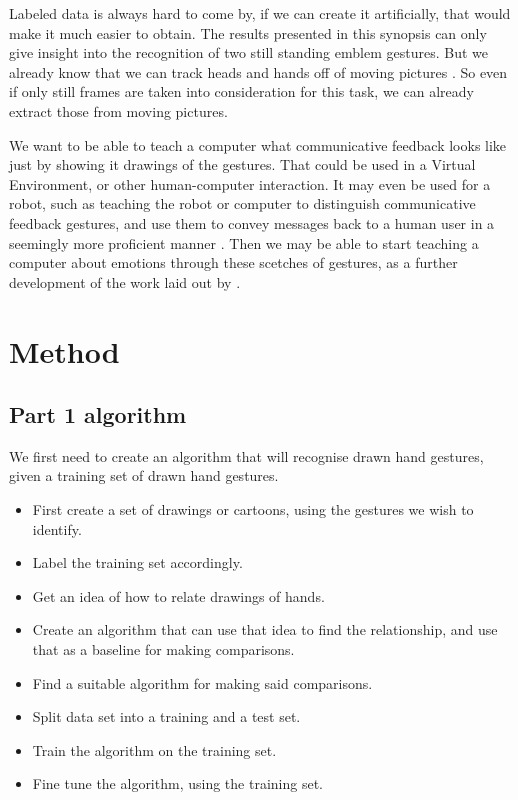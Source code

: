 \documentclass[11pt,a4paper]{article}
\begin{document}
Labeled data is always hard to come by, if we can create it artificially, that would make it much easier to obtain. The results presented in this synopsis can only give insight into the recognition of two still standing emblem gestures. But we already know that we can track heads and hands off of moving pictures \cite{rehm}. So even if only still frames are taken into consideration for this task, we can already extract those from moving pictures.

We want to be able to teach a computer what communicative feedback looks like just by showing it drawings of the gestures. That could be used in a Virtual Environment, or other human-computer interaction. It may even be used for a robot, such as teaching the robot or computer to distinguish communicative feedback gestures, and use them to convey messages back to a human user in a seemingly more proficient manner \cite{allwood}. Then we may be able to start teaching a computer about emotions through these scetches of gestures, as a further development of the work laid out by \cite{kipp}.

\section{Method}
\label{sec:method}

\subsection{Part 1 algorithm}
\label{sec:part-1-algorithm}

We first need to create an algorithm that will recognise drawn hand gestures, given a training set of drawn hand gestures.

\begin{itemize}
\item First create a set of drawings or cartoons, using the gestures we wish to identify.
\item Label the training set accordingly.
\item Get an idea of how to relate drawings of hands.
\item Create an algorithm that can use that idea to find the relationship, and use that as a baseline for making comparisons.
\item Find a suitable algorithm for making said comparisons.
\item Split data set into a training and a test set.
\item Train the algorithm on the training set.
\item Fine tune the algorithm, using the training set.
\end{itemize}
\end{document}
